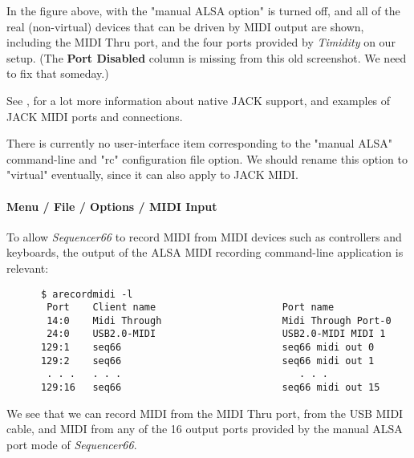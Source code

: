    In the figure above, with the "manual ALSA option" is turned off, and
   all of the real (non-virtual) devices that can be driven by MIDI output are
   shown, including the MIDI Thru port, and
   the four ports provided by \textsl{Timidity} on our setup.
   (The \textbf{Port Disabled} column is missing from this old screenshot.  We
   need to fix that someday.)

   See ,
   for a lot more information about native JACK support, and examples of JACK
   MIDI ports and connections.

   There is currently no user-interface item corresponding to the "manual ALSA"
   command-line and "rc" configuration file option.
   We should rename this option to "virtual"
   eventually, since it can also apply to JACK MIDI.

\paragraph{Menu / File / Options / MIDI Input}
\label{paragraph:seq66_menu_file_options_midi_input}

   To allow \textsl{Sequencer66} to record MIDI from MIDI devices such as
   controllers and keyboards, the output of the ALSA MIDI recording
   command-line application is relevant:

   \begin{verbatim}
      $ arecordmidi -l
       Port    Client name                      Port name
       14:0    Midi Through                     Midi Through Port-0
       24:0    USB2.0-MIDI                      USB2.0-MIDI MIDI 1
      129:1    seq66                            seq66 midi out 0
      129:2    seq66                            seq66 midi out 1
       . . .   . . .                               . . .
      129:16   seq66                            seq66 midi out 15
   \end{verbatim}


   We see that we can record MIDI from the MIDI Thru port, from the USB MIDI
   cable, and MIDI from any of the 16 output ports provided by the manual ALSA
   port mode of \textsl{Sequencer66}.

